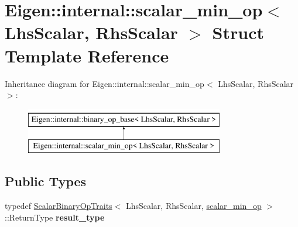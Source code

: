 \hypertarget{struct_eigen_1_1internal_1_1scalar__min__op}{}\section{Eigen\+::internal\+::scalar\+\_\+min\+\_\+op$<$ Lhs\+Scalar, Rhs\+Scalar $>$ Struct Template Reference}
\label{struct_eigen_1_1internal_1_1scalar__min__op}
Inheritance diagram for Eigen\+::internal\+::scalar\+\_\+min\+\_\+op$<$ Lhs\+Scalar, Rhs\+Scalar $>$\+:\begin{figure}[H]
\begin{center}
\leavevmode
\includegraphics[height=2.000000cm]{struct_eigen_1_1internal_1_1scalar__min__op}
\end{center}
\end{figure}
\subsection*{Public Types}
\begin{DoxyCompactItemize}
\item 
\mbox{\label{struct_eigen_1_1internal_1_1scalar__min__op_a31cf08569729e409dad71f1eb04a13ef}} 
typedef \mbox{\hyperlink{struct_eigen_1_1_scalar_binary_op_traits}{Scalar\+Binary\+Op\+Traits}}$<$ Lhs\+Scalar, Rhs\+Scalar, \mbox{\hyperlink{struct_eigen_1_1internal_1_1scalar__min__op}{scalar\+\_\+min\+\_\+op}} $>$\+::Return\+Type {\bfseries result\+\_\+type}
\end{DoxyCompactItemize}
